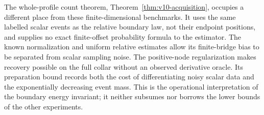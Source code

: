 
The whole-profile count theorem, Theorem~\ref{thm:v10-acquisition},
occupies a different place from these finite-dimensional benchmarks.
It uses the same labelled scalar events as the relative boundary law,
not their endpoint positions, and supplies no exact finite-offset
probability formula to the estimator. The known normalization and
uniform relative estimates allow its finite-bridge bias to be separated
from scalar sampling noise. The positive-node regularization makes
recovery possible on the full collar without an observed derivative
oracle. Its preparation bound records both the cost of differentiating
noisy scalar data and the exponentially decreasing event mass. This
is the operational interpretation of the boundary energy invariant;
it neither subsumes nor borrows the lower bounds of the other experiments.
